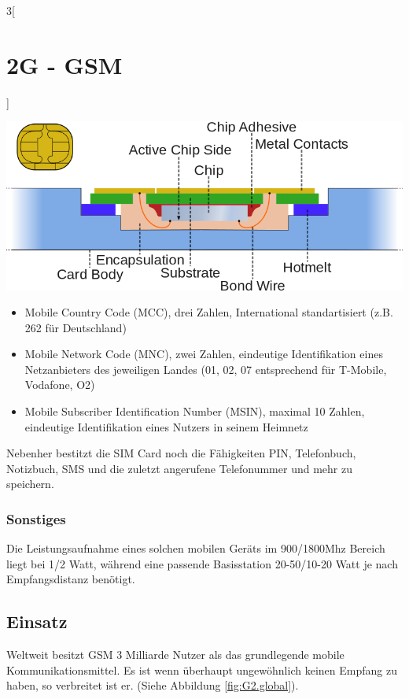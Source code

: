 \begin{multicols}{3}[\section{2G - GSM}]
\begin{Figure}
\includegraphics[width=\linewidth]{Kapitel/G2/Grafiken/GSM-SIM.png}
\label{fig:G2.sim}
\end{Figure}

\begin{itemize}
	\item Mobile Country Code (MCC), drei Zahlen, International standartisiert (z.B. 262 für Deutschland)
	\item Mobile Network Code (MNC), zwei Zahlen, eindeutige Identifikation eines Netzanbieters des jeweiligen Landes (01, 02, 07 entsprechend für T-Mobile, Vodafone, O2)
	\item Mobile Subscriber Identification Number (MSIN), maximal 10 Zahlen, eindeutige Identifikation eines Nutzers in seinem Heimnetz
\end{itemize}

Nebenher bestitzt die SIM Card noch die Fähigkeiten PIN, Telefonbuch, Notizbuch, SMS und die zuletzt angerufene Telefonummer und mehr zu speichern.\cite{G2.1}

\subsubsection*{Sonstiges}

Die Leistungsaufnahme eines solchen mobilen Geräts im 900/1800Mhz Bereich liegt bei 1/2 Watt, während eine passende Basisstation 20-50/10-20 Watt je nach Empfangsdistanz benötigt.\cite{G2.2}

\subsection*{Einsatz}
Weltweit besitzt GSM 3 Milliarde Nutzer als das grundlegende mobile Kommunikationsmittel. Es ist wenn überhaupt ungewöhnlich keinen Empfang zu haben, so verbreitet ist er. (Siehe Abbildung \ref{fig:G2.global}).


\end{multicols}
\newpage
